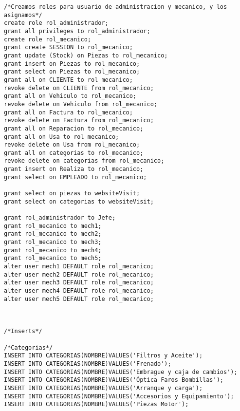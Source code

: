 \begin{lstlisting}[caption=Script .sql para crear la BD.]
/*Creamos roles para usuario de administracion y mecanico, y los asignamos*/
create role rol_administrador;
grant all privileges to rol_administrador;
create role rol_mecanico;
grant create SESSION to rol_mecanico;
grant update (Stock) on Piezas to rol_mecanico;
grant insert on Piezas to rol_mecanico;
grant select on Piezas to rol_mecanico;
grant all on CLIENTE to rol_mecanico;
revoke delete on CLIENTE from rol_mecanico;
grant all on Vehiculo to rol_mecanico;
revoke delete on Vehiculo from rol_mecanico;
grant all on Factura to rol_mecanico;
revoke delete on Factura from rol_mecanico;
grant all on Reparacion to rol_mecanico;
grant all on Usa to rol_mecanico;
revoke delete on Usa from rol_mecanico;
grant all on categorias to rol_mecanico;
revoke delete on categorias from rol_mecanico;
grant insert on Realiza to rol_mecanico;
grant select on EMPLEADO to rol_mecanico;

grant select on piezas to websiteVisit;
grant select on categorias to websiteVisit;

grant rol_administrador to Jefe;
grant rol_mecanico to mech1;
grant rol_mecanico to mech2;
grant rol_mecanico to mech3;
grant rol_mecanico to mech4;
grant rol_mecanico to mech5;
alter user mech1 DEFAULT role rol_mecanico;
alter user mech2 DEFAULT role rol_mecanico;
alter user mech3 DEFAULT role rol_mecanico;
alter user mech4 DEFAULT role rol_mecanico;
alter user mech5 DEFAULT role rol_mecanico;



/*Inserts*/

/*Categorias*/
INSERT INTO CATEGORIAS(NOMBRE)VALUES('Filtros y Aceite');
INSERT INTO CATEGORIAS(NOMBRE)VALUES('Frenado');
INSERT INTO CATEGORIAS(NOMBRE)VALUES('Embrague y caja de cambios');
INSERT INTO CATEGORIAS(NOMBRE)VALUES('Óptica Faros Bombillas');
INSERT INTO CATEGORIAS(NOMBRE)VALUES('Arranque y carga');
INSERT INTO CATEGORIAS(NOMBRE)VALUES('Accesorios y Equipamiento');
INSERT INTO CATEGORIAS(NOMBRE)VALUES('Piezas Motor');




\end{lstlisting}
